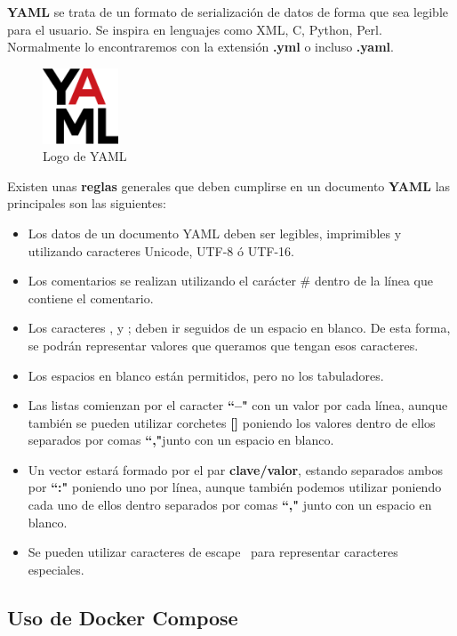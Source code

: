 \textbf{YAML} se trata de un formato de serialización de datos de forma que sea legible para el usuario. Se inspira en lenguajes como XML, C, Python, Perl. Normalmente lo encontraremos con la extensión \textbf{.yml} o incluso \textbf{.yaml}.
\begin{figure}[H]
	\centering
	\includegraphics[width=0.2\textwidth]{imagenes/despliegue_naemon/yaml.png}
	\caption{Logo de YAML} \label{yml}
\end{figure}
\newpage
Existen unas \textbf{reglas} generales que deben cumplirse en un documento \textbf{YAML} las principales son las siguientes:
\begin{itemize}
	\item Los datos de un documento YAML deben ser legibles, imprimibles y utilizando caracteres Unicode, UTF-8 ó UTF-16.
	\item Los comentarios se realizan utilizando el carácter \# dentro de la línea que contiene el comentario.
	\item Los caracteres , y ; deben ir seguidos de un espacio en blanco. De esta forma, se podrán representar valores que queramos que tengan esos caracteres.
	\item Los espacios en blanco están permitidos, pero no los tabuladores.
	\item Las listas comienzan por el caracter \textbf{``–"} con un valor por cada línea, aunque también se pueden utilizar corchetes \textbf{[]} poniendo los valores dentro de ellos separados por comas \textbf{``,"}junto con un espacio en blanco.
	\item Un vector estará formado por el par \textbf{clave/valor}, estando separados ambos por \textbf{``:"} poniendo uno por línea, aunque también podemos utilizar \textbf{{}} poniendo cada uno de ellos dentro separados por comas \textbf{``,"} junto con un espacio en blanco.
	\item Se pueden utilizar caracteres de escape \ para representar caracteres especiales.
\end{itemize}

\subsection{Uso de Docker Compose}

